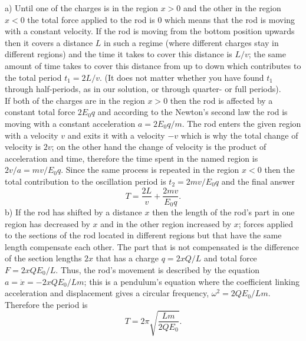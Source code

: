 {\ifEngSolution
a) Until one of the charges is in the region $x>0$ and the other in the region $x<0$ the total force applied to the rod is 0 which means that the rod is moving with a constant velocity. If the rod is moving from the bottom position upwards then it covers a distance $L$ in such a regime (where different charges stay in different regions) and the time it takes to cover this distance is $L/v$; the same amount of time takes to cover this distance from up to down which contributes to the total period $t_1=2L/v$. (It does not matter whether you have found $t_1$ through half-periods, as in our solution, or through quarter- or full periods).\\
If both of the charges are in the region $x> 0$ then the rod is affected by a constant total force $2E_0q$ and according to the Newton’s second law the rod is moving with a constant acceleration $a=2E_0q/m$. The rod enters the given region with a velocity $v$ and exits it with a velocity $-v$ which is why the total change of velocity is $2v$; on the other hand the change of velocity is the product of acceleration and time, therefore the time spent in the named region is $2v/a=mv/E_0q$. Since the same process is repeated in the region $x<0$ then the total contribution to the oscillation period is $t_2=2mv/E_0q$ and the final answer 
\[ T=\frac{2L}v+\frac {2mv}{E_0q}. \] 
b) If the rod has shifted by a distance $x$ then the length of the rod’s part in one region has decreased by $x$ and in the other region increased by $x$; forces applied to the sections of the rod located in different regions but that have the same length compensate each other. The part that is not compensated is the difference of the section lengths $2x$ that has a charge $q=2xQ/L$ and total force $F=2xQE_0/L$. Thus, the rod’s movement is described by the equation $a=\ddot x= -2xQE_0/Lm$; this is a pendulum’s equation where the coefficient linking acceleration and displacement gives a circular frequency, $\omega^2=2QE_0/Lm$. Therefore the period is
\[ T=2\pi\sqrt{\frac{Lm}{2QE_0}}.\]
\fi
}